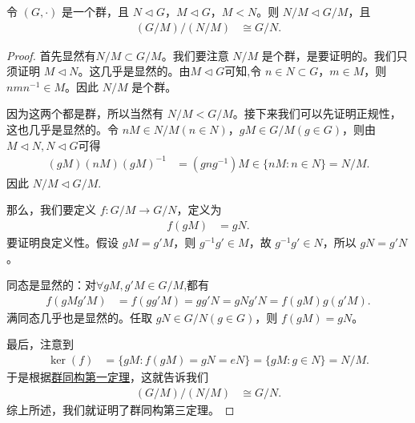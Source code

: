 \documentclass[../../main.tex]{subfiles}
\begin{document}
\begin{theorem}[群同构第三定理]\label{theorem:群同构第三定理}
令 \((G, \cdot)\) 是一个群，且 \(N \lhd G\)，\(M \lhd G\)，\(M < N\)。则 \(N/M \lhd G/M\)，且
\begin{align*}
(G/M)/(N/M) &\cong G/N .
\end{align*}
\end{theorem}
\begin{proof}
首先显然有\(N/M \subset G/M\)。我们要注意 \(N/M\) 是个群，是要证明的。我们只须证明 \(M \lhd N\)。这几乎是显然的。由$M\lhd G$可知,令 \(n \in N\subset G\)，\(m \in M\)，则 \(nmn^{-1} \in M\)。因此 \(N/M\) 是个群。

因为这两个都是群，所以当然有 \(N/M < G/M\)。接下来我们可以先证明正规性，这也几乎是显然的。令 \(nM \in N/M (n \in N)\)，\(gM \in G/M (g \in G)\)，则由$M\lhd N,N\lhd G$可得
\begin{align*}
(gM)(nM)(gM)^{-1} &= (gng^{-1})M \in \{nM : n \in N\} = N/M .
\end{align*}
因此 \(N/M \lhd G/M\).

那么，我们要定义 \(f: G/M \to G/N\)，定义为
\begin{align*}
f(gM) &= gN .
\end{align*}
要证明良定义性。假设 \(gM = g'M\)，则 \(g^{-1}g' \in M\)，故 \(g^{-1}g' \in N\)，所以 \(gN = g'N\)。

同态是显然的：对$\forall gM,g'M\in G/M$,都有
\begin{align*}
f(gMg'M) &= f(gg'M) = gg'N = gNg'N = f(gM)g(g'M) .
\end{align*}
满同态几乎也是显然的。任取 \(gN \in G/N (g \in G)\)，则 \(f(gM) = gN\)。

最后，注意到
\begin{align*}
\ker(f) &= \{gM : f(gM) = gN = eN\} = \{gM : g \in N\} = N/M .
\end{align*}
于是根据\hyperref[theorem:群同构第一定理]{群同构第一定理}，这就告诉我们
\begin{align*}
(G/M)/(N/M) &\cong G/N.
\end{align*}
综上所述，我们就证明了群同构第三定理。 
\end{proof}
\end{document}
